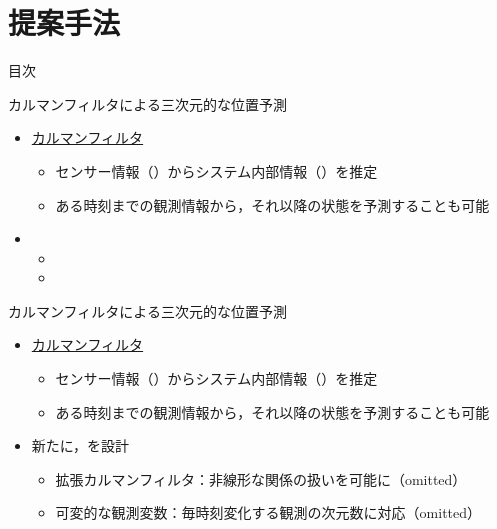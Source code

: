 \section{提案手法}

\begin{frame}[noframenumbering]{目次}
    \tableofcontents[currentsection]
\end{frame}

\begin{frame}{カルマンフィルタによる三次元的な位置予測}
    \begin{itemize}
        \item \uline{カルマンフィルタ} \cite{bishop2001introduction}
        \begin{itemize}
            \item センサー情報（）からシステム内部情報（）を推定
            \item ある時刻までの観測情報から，それ以降の状態を予測することも可能
        \end{itemize}
        \item[\phantom{}] 
        \begin{itemize}
            \item[\phantom{}] \phantom{拡張カルマンフィルタ：非線形な関係の扱いを可能に（omitted）}
            \item[\phantom{}] \phantom{可変的な観測変数：毎時刻変化する観測の次元数に対応（omitted）}
        \end{itemize}
    \end{itemize}
\end{frame}
\begin{frame}[noframenumbering]{カルマンフィルタによる三次元的な位置予測}
    \begin{itemize}
        \item \uline{カルマンフィルタ} \cite{bishop2001introduction}
        \begin{itemize}
            \item センサー情報（）からシステム内部情報（）を推定
            \item ある時刻までの観測情報から，それ以降の状態を予測することも可能
        \end{itemize}
        \item 新たに，を設計
        \begin{itemize}
            \item 拡張カルマンフィルタ：非線形な関係の扱いを可能に（omitted）
            \item 可変的な観測変数：毎時刻変化する観測の次元数に対応（omitted）
        \end{itemize}
    \end{itemize}
\end{frame}
